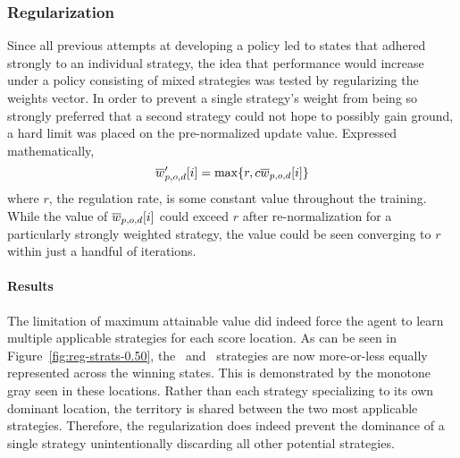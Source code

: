 

\subsubsection*{Regularization}


Since all previous attempts at developing a policy led to
states that adhered strongly to an individual strategy,
the idea that performance would increase
under a policy consisting of mixed strategies
was tested by regularizing the weights vector.
%
In order to prevent a single strategy's weight from being so strongly
preferred that a second strategy could not hope to possibly gain ground,
a hard limit was placed on the pre-normalized update value.
%
Expressed mathematically,
\[
    \overline{w}'_{p,o,d}[i] = \max\{r,c\overline{w}_{p,o,d}[i]\}
\]
where $r$, the regulation rate, is some constant value throughout the training.
%
While the value of $\overline{w}_{p,o,d}[i]$ could exceed $r$ after re-normalization
for a particularly strongly weighted strategy,
the value could be seen converging to $r$ within just a handful of iterations.

\paragraph*{Results}



%
%



The limitation of maximum attainable value did indeed force the agent to learn
multiple applicable strategies for each score location.
%
As can be seen in Figure~\ref{fig:reg-strats-0.50},
the \handmaxmin\ and \handmaxavg\ strategies are now 
more-or-less equally represented across the winning states.
%
This is demonstrated by the monotone gray seen in these locations.
%
Rather than each strategy specializing to its own dominant location,
the territory is shared between the two most applicable strategies.
%
Therefore,
the regularization does indeed prevent the dominance of a single strategy
unintentionally discarding all other potential strategies.

